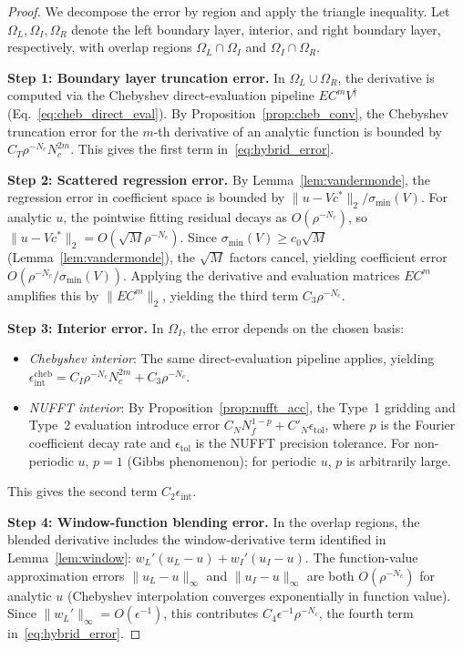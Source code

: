 \documentclass[sn-mathphys,Numbered]{sn-jnl}
\theoremstyle{thmstyleone}
\theoremstyle{thmstyletwo}
\theoremstyle{thmstylethree}
\newcommand{\cheb}{\mathrm{cheb}}
\begin{document}
\begin{proof}
We decompose the error by region and apply the triangle inequality. Let $\Omega_L,\Omega_I,\Omega_R$ denote the left boundary layer, interior, and right boundary layer, respectively, with overlap regions $\Omega_L\cap\Omega_I$ and $\Omega_I\cap\Omega_R$.

\textbf{Step 1: Boundary layer truncation error.}
In $\Omega_L\cup\Omega_R$, the derivative is computed via the Chebyshev direct-evaluation pipeline $EC^mV^\dagger$ (Eq.~\eqref{eq:cheb_direct_eval}). By Proposition~\ref{prop:cheb_conv}, the Chebyshev truncation error for the $m$-th derivative of an analytic function is bounded by $C_T\rho^{-N_c}N_c^{2m}$. This gives the first term in~\eqref{eq:hybrid_error}.

\textbf{Step 2: Scattered regression error.}
By Lemma~\ref{lem:vandermonde}, the regression error in coefficient space is bounded by $\|u-Vc^*\|_2/\sigma_{\min}(V)$. For analytic $u$, the pointwise fitting residual decays as $O(\rho^{-N_c})$, so $\|u-Vc^*\|_2=O(\sqrt{M}\rho^{-N_c})$. Since $\sigma_{\min}(V)\geq c_0\sqrt{M}$ (Lemma~\ref{lem:vandermonde}), the $\sqrt{M}$ factors cancel, yielding coefficient error $O(\rho^{-N_c}/\sigma_{\min}(V))$. Applying the derivative and evaluation matrices $EC^m$ amplifies this by $\|EC^m\|_2$, yielding the third term $C_3\rho^{-N_c}$.

\textbf{Step 3: Interior error.}
In $\Omega_I$, the error depends on the chosen basis:
\begin{itemize}
    \item \textit{Chebyshev interior}: The same direct-evaluation pipeline applies, yielding $\epsilon_{\mathrm{int}}^{\cheb}=C_I\rho^{-N_c}N_c^{2m}+C_3\rho^{-N_c}$.
    \item \textit{NUFFT interior}: By Proposition~\ref{prop:nufft_acc}, the Type~1 gridding and Type~2 evaluation introduce error $C_N N_f^{1-p}+C'_N\epsilon_{\mathrm{tol}}$, where $p$ is the Fourier coefficient decay rate and $\epsilon_{\mathrm{tol}}$ is the NUFFT precision tolerance. For non-periodic $u$, $p=1$ (Gibbs phenomenon); for periodic $u$, $p$ is arbitrarily large.
\end{itemize}
This gives the second term $C_2\epsilon_{\mathrm{int}}$.

\textbf{Step 4: Window-function blending error.}
In the overlap regions, the blended derivative includes the window-derivative term identified in Lemma~\ref{lem:window}: $w_L'(u_L-u)+w_I'(u_I-u)$. The function-value approximation errors $\|u_L-u\|_\infty$ and $\|u_I-u\|_\infty$ are both $O(\rho^{-N_c})$ for analytic $u$ (Chebyshev interpolation converges exponentially in function value). Since $\|w_L'\|_\infty=O(\epsilon^{-1})$, this contributes $C_4\epsilon^{-1}\rho^{-N_c}$, the fourth term in~\eqref{eq:hybrid_error}.


\end{proof}
\end{document}
